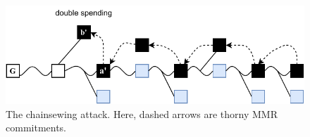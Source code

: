 	\begin{figure}
		\begin{center}
			\includegraphics[width=0.95\columnwidth]{figures/flyclient_combined_attack.pdf}
		\end{center}
		\caption{The chainsewing attack. Here, dashed arrows are thorny MMR commitments.}
		\label{fig:combined_chainsewing_flyclient}
	\end{figure}
